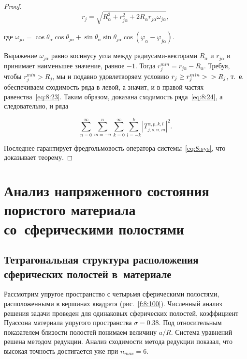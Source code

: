 \begin{proof}
\begin{equation}
r_j = \sqrt{R_\alpha^2 + r_{j\alpha}^2 + 
2R_\alpha r_{j\alpha}\omega_{j\alpha}},
\end{equation}

\noindent где $\omega_{j\alpha}=\cos\theta_\alpha\cos\theta_{j\alpha}+
\sin\theta_\alpha\sin\theta_{j\alpha}\cos(\varphi_\alpha-\varphi_{j\alpha})$.

Выражение $\omega_{j\alpha}$ равно косинусу угла между радиусами-векторами $R_\alpha$ и $r_{j\alpha}$ и принимает наименьшее значение, равное $-1$. Тогда $r_j^{min}=r_{j\alpha}-R_\alpha$. Требуя, чтобы $r_j^{min}>R_j$, мы и подавно удовлетворяем условию $r_j\ge r_j^{min}>\\>R_j$, т.~е. обеспечиваем сходимость ряда в левой, а значит, и в правой частях равенства~\eqref{eq:8:23}. Таким образом, доказана сходимость ряда~\eqref{eq:8:24}, а следовательно, и ряда

\begin{equation}
\sum\limits_{n = 0}^\infty  {\sum\limits_{m =  - n}^n {\sum\limits_{k = 0}^\infty  {\sum\limits_{l =  - k}^k {{{\left| {T_{j,s,n,m}^{\alpha,p,k,l}} \right|}^2}}}}}.
\end{equation}

Последнее гарантирует фредгольмовость оператора системы~\eqref{eq:8:sys}, что доказывает теорему.
\end{proof}

\section{Анализ напряженного состояния пористого материала со~сферическими полостями}

\subsection{Тетрагональная структура расположения сферических полостей в~материале}

Рассмотрим упругое пространство с четырьмя сферическими полостями, расположенными в вершинах квадрата (рис.~\ref{f:8:100}). Численный анализ решения задачи проведен для одинаковых сферических полостей, коэффициент Пуассона материала упругого пространства $\sigma=0.38$. Под относительным показателем близости полостей понимаем величину $a/R$. Система уравнений решена методом редукции. Анализ сходимости метода редукции показал, что высокая точность достигается уже при $n_{max}=6$.

